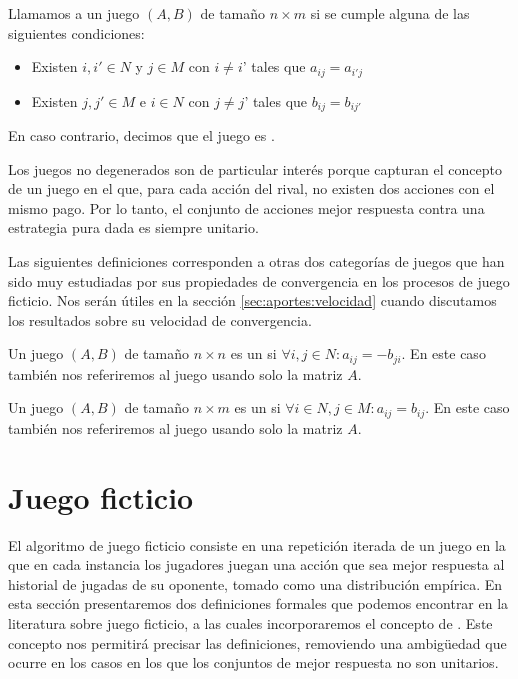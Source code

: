 \begin{definition}
    Llamamos  a un juego $(A, B)$ de tamaño $n \times m$ si se cumple alguna de las siguientes condiciones:
    \begin{itemize}
        \item Existen $i, i' \in N$ y $j \in M$ con $i \neq i$' tales que $a_{ij} = a_{i'j}$
        \item Existen $j, j' \in M$ e $i \in N$ con $j \neq j$' tales que $b_{ij} = b_{ij'}$
    \end{itemize}
    En caso contrario, decimos que el juego es .
\end{definition}
Los juegos no degenerados son de particular interés porque capturan el concepto de un juego en el que, para cada acción del rival, no existen dos acciones con el mismo pago. Por lo tanto, el conjunto de acciones mejor respuesta contra una estrategia pura dada es siempre unitario.

Las siguientes definiciones corresponden a otras dos categorías de juegos que han sido muy estudiadas por sus propiedades de convergencia en los procesos de juego ficticio. Nos serán útiles en la sección \ref{sec:aportes:velocidad} cuando discutamos los resultados sobre su velocidad de convergencia.

\begin{definition}
    Un juego $(A, B)$ de tamaño $n \times n$ es un  si $\forall i, j \in N : a_{ij} = -b_{ji}$. En este caso también nos referiremos al juego usando solo la matriz $A$.
\end{definition}

\begin{definition}
    Un juego $(A, B)$ de tamaño $n \times m$ es un  si $\forall i \in N, j \in M : a_{ij} = b_{ij}$. En este caso también nos referiremos al juego usando solo la matriz $A$.
\end{definition}


\section{Juego ficticio} \label{sec:def:fp}

El algoritmo de juego ficticio consiste en una repetición iterada de un juego en la que en cada instancia los jugadores juegan una acción que sea mejor respuesta al historial de jugadas de su oponente, tomado como una distribución empírica. En esta sección presentaremos dos definiciones formales que podemos encontrar en la literatura sobre juego ficticio, a las cuales incorporaremos el concepto de . Este concepto nos permitirá precisar las definiciones, removiendo una ambigüedad que ocurre en los casos en los que los conjuntos de mejor respuesta no son unitarios.

